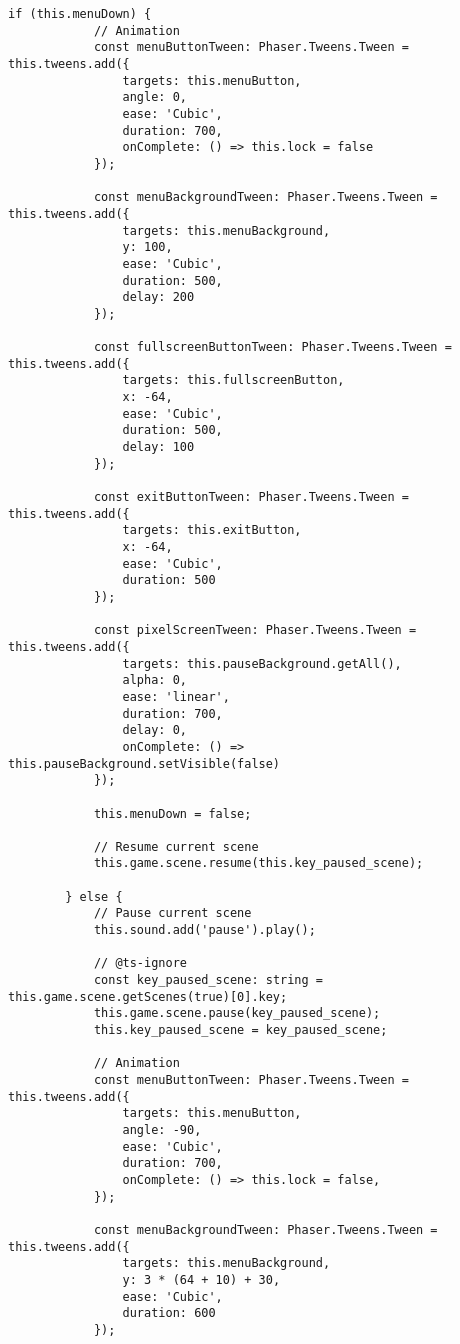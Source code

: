 \begin{lstlisting}[style=TypeScript, caption={dropDownMenu.ts}]
        if (this.menuDown) {
            // Animation
            const menuButtonTween: Phaser.Tweens.Tween = this.tweens.add({
                targets: this.menuButton,
                angle: 0,
                ease: 'Cubic',
                duration: 700,
                onComplete: () => this.lock = false
            });

            const menuBackgroundTween: Phaser.Tweens.Tween = this.tweens.add({
                targets: this.menuBackground,
                y: 100,
                ease: 'Cubic',
                duration: 500,
                delay: 200
            });

            const fullscreenButtonTween: Phaser.Tweens.Tween = this.tweens.add({
                targets: this.fullscreenButton,
                x: -64,
                ease: 'Cubic',
                duration: 500,
                delay: 100
            });

            const exitButtonTween: Phaser.Tweens.Tween = this.tweens.add({
                targets: this.exitButton,
                x: -64,
                ease: 'Cubic',
                duration: 500
            });

            const pixelScreenTween: Phaser.Tweens.Tween = this.tweens.add({
                targets: this.pauseBackground.getAll(),
                alpha: 0,
                ease: 'linear',
                duration: 700,
                delay: 0,
                onComplete: () => this.pauseBackground.setVisible(false)
            });

            this.menuDown = false;

            // Resume current scene
            this.game.scene.resume(this.key_paused_scene);

        } else {
            // Pause current scene
            this.sound.add('pause').play();

            // @ts-ignore
            const key_paused_scene: string = this.game.scene.getScenes(true)[0].key;
            this.game.scene.pause(key_paused_scene);
            this.key_paused_scene = key_paused_scene;

            // Animation
            const menuButtonTween: Phaser.Tweens.Tween = this.tweens.add({
                targets: this.menuButton,
                angle: -90,
                ease: 'Cubic',
                duration: 700,
                onComplete: () => this.lock = false,
            });

            const menuBackgroundTween: Phaser.Tweens.Tween = this.tweens.add({
                targets: this.menuBackground,
                y: 3 * (64 + 10) + 30,
                ease: 'Cubic',
                duration: 600
            });


\end{lstlisting}
